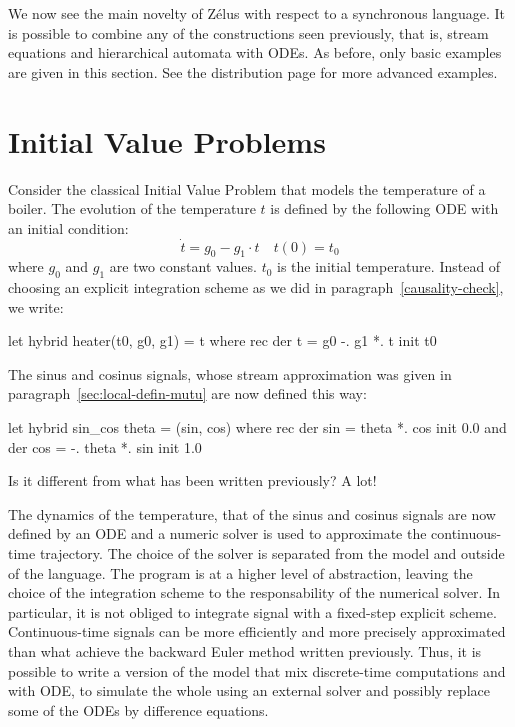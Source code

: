 \documentclass[11pt,titlepage,twoside]{report}
\newcommand{\zelus}{{\sf Z\'elus}}
\begin{document}
We now see the main novelty of \zelus{} with respect to a
synchronous language. It is possible to combine any of the
constructions seen previously, that is, stream equations and hierarchical
automata with \acp{ODE}. As before, only
basic examples are given in this section. See the distribution page for
more advanced examples.

\section{Initial Value Problems}
Consider the classical Initial Value Problem that models the temperature
of a boiler. The evolution of the temperature $t$ is defined by the following
\ac{ODE} with an initial condition:
\[
\dot{t} = g_0 - g_1 \cdot t \quad t(0) = t_0
\]
where $g_0$ and $g_1$ are two constant values.
$t_0$ is the initial temperature. Instead
of choosing an explicit integration scheme as we did in
paragraph~\ref{causality-check}, we write:

\begin{runverbatim}[withresult]
let hybrid heater(t0, g0, g1) = t where
  rec der t = g0 -. g1 *. t init t0
\end{runverbatim}

The sinus and cosinus signals, whose stream approximation was given in
paragraph~\ref{sec:local-defin-mutu} are now defined this way:
\begin{runverbatim}[withresult]
let hybrid sin_cos theta = (sin, cos) where
  rec der sin = theta *. cos init 0.0
  and der cos = -. theta *. sin init 1.0
\end{runverbatim}

Is it different from what has been written previously? A lot!

\medskip
The dynamics of the temperature, that of the sinus and cosinus signals
are now defined by an \ac{ODE} and a
numeric solver is used to approximate the continuous-time
trajectory. The choice of the solver is separated from the model and
outside of the language. The program is at a higher level of
abstraction, leaving the choice of the integration scheme to the
responsability of the numerical solver. In particular, it is not
obliged to integrate signal with a fixed-step explicit
scheme. Continuous-time signals can be more efficiently and more
precisely approximated than what achieve the backward Euler method
written previously. Thus, it is possible to write a version of the
model that mix discrete-time computations and with \ac{ODE},
to simulate the whole using an external solver and possibly replace some of the
\acp{ODE} by difference equations.
\end{document}
